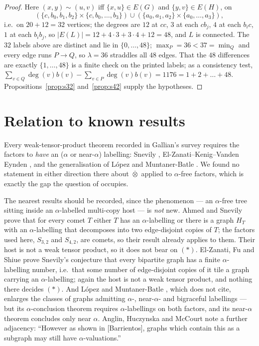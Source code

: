 \documentclass[11pt]{amsart}
\theoremstyle{definition}
\theoremstyle{remark}
\newcommand{\wtp}{\mathbin{\overline{\otimes}}}
\begin{document}
\begin{proof}
Here $(x,y)\sim(u,v)$ iff $\{x,u\}\in E(G)$ and $\{y,v\}\in E(H)$, on
\[
 (\{c,b_0,b_1,b_2\}\times\{c,b_0,\dots,b_3\})\cup
 (\{a_0,a_1,a_2\}\times\{a_0,\dots,a_3\}),
\]
i.e.\ on $20+12=32$ vertices; the
degrees are $12$ at $cc$, $3$ at each $cb_j$, $4$ at each $b_ic$, $1$ at each
$b_ib_j$, so $|E(L)|=12+4\cdot3+3\cdot4+12=48$, and $L$ is connected. The $32$
labels above are distinct and lie in $\{0,\dots,48\}$; $\max_P=36<37=\min_Q$
and every edge runs $P\to Q$, so $\lambda=36$ straddles all $48$ edges. That
the $48$ differences are exactly $\{1,\dots,48\}$ is a finite check on the
printed labels; as a consistency test,
$\sum_{v\in Q}\deg(v)b(v)-\sum_{v\in P}\deg(v)b(v)=1176=1+2+\dots+48$.
Propositions~\ref{prop:s32} and~\ref{prop:s42} supply the hypotheses.
\end{proof}

\section{Relation to known results}

Every weak-tensor-product theorem recorded in Gallian's survey \cite{Gallian}
requires the factors to \emph{have} an ($\alpha$ or near-$\alpha$) labelling:
Snevily \cite{Snevily}, El-Zanati--Kenig--Vanden Eynden \cite[Thm.~7]{EKV}, and
the generalisation of L\'opez and Muntaner-Batle \cite{LM}. We found no
statement in either direction there about $\wtp$ applied to $\alpha$-free
factors, which is exactly the gap the question of \cite{AHM} occupies.

The nearest results should be recorded, since the phenomenon --- an
$\alpha$-free tree sitting inside an $\alpha$-labelled multi-copy host --- is
\emph{not} new. Ahmed and Snevily
\cite{AS} prove that for every comet $T$ either $T$ has an $\alpha$-labelling or
there is a graph $H_T$ with an $\alpha$-labelling that decomposes into two
edge-disjoint copies of $T$; the factors used here, $S_{3,2}$ and $S_{4,2}$, are
comets, so their result already applies to them. Their host is not a weak tensor
product, so it does not bear on $(\ast)$. El-Zanati, Fu and Shiue \cite{EFS}
prove Snevily's conjecture that every bipartite graph has a finite
$\alpha$-labelling number, i.e.\ that some number of edge-disjoint copies of it
tile a graph carrying an $\alpha$-labelling; again the host is not a weak tensor
product, and nothing there decides $(\ast)$. And L\'opez and Muntaner-Batle
\cite{LM}, which \cite{AHM} does not cite, enlarges the classes of graphs
admitting $\alpha$-, near-$\alpha$- and bigraceful labellings --- but its
$\alpha$-conclusion theorem requires $\alpha$-labellings on both factors, and its
near-$\alpha$ theorem concludes only near $\alpha$. Anglin, Huczynska and McCourt
note a further adjacency: ``However as shown in [Barrientos], graphs which
contain this as a subgraph may still have $\alpha$-valuations.''
\end{document}

